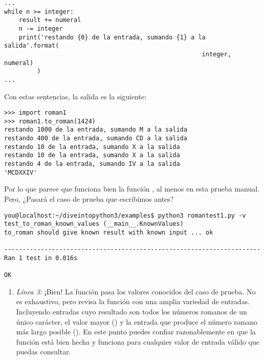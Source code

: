 \noindent\begin{minipage}{\textwidth}
\begin{lstlisting}[mathescape=True]
...
while n >= integer:
    result += numeral
    n -= integer
    print('restando {0} de la entrada, sumando {1} a la salida'.format(
                                                      integer, numeral)
         )
...
\end{lstlisting}
\end{minipage}

Con estas sentencias, la salida es la siguiente:

\noindent\begin{minipage}{\textwidth}
\begin{lstlisting}[mathescape=True]
>>> import roman1
>>> roman1.to_roman(1424)
restando 1000 de la entrada, sumando M a la salida
restando 400 de la entrada, sumando CD a la salida
restando 10 de la entrada, sumando X a la salida
restando 10 de la entrada, sumando X a la salida
restando 4 de la entrada, sumando IV a la salida
'MCDXXIV'
\end{lstlisting}
\end{minipage}

Por lo que parece que funciona bien la función , al menos en esta prueba manual. Pero, ¿Pasará el caso de prueba que escribimos antes?

\noindent\begin{minipage}{\textwidth}
\begin{lstlisting}[mathescape=False]
you@localhost:~/diveintopython3/examples$ python3 romantest1.py -v
test_to_roman_known_values (__main__.KnownValues)
to_roman should give known result with known input ... ok

----------------------------------------------------------------------
Ran 1 test in 0.016s

OK
\end{lstlisting}
\end{minipage}

\begin{enumerate}

\item \emph{Línea 3:} ¡Bien! La función  pasa los valores conocidos del caso de prueba. No es exhaustivo, pero revisa la función con una amplia variedad de entradas. Incluyendo entradas cuyo resultado son todos los números romanos de un único carácter, el valor mayor () y la entrada que produce el número romano más largo posible (). En este punto puedes confiar razonablemente en que la función está bien hecha y funciona para cualquier valor de entrada válido que puedas consultar.

\end{enumerate}

